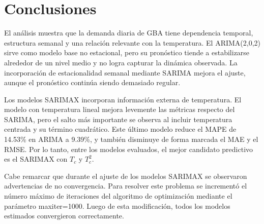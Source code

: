 \documentclass[11pt,a4paper]{article}
\begin{document}
\section{Conclusiones}

El análisis muestra que la demanda diaria de GBA tiene dependencia temporal, estructura semanal y una relación relevante con la temperatura. El ARIMA(2,0,2) sirve como modelo base no estacional, pero su pronóstico tiende a estabilizarse alrededor de un nivel medio y no logra capturar la dinámica observada. La incorporación de estacionalidad semanal mediante SARIMA mejora el ajuste, aunque el pronóstico continúa siendo demasiado regular.

Los modelos SARIMAX incorporan información externa de temperatura. El modelo con temperatura lineal mejora levemente las métricas respecto del SARIMA, pero el salto más importante se observa al incluir temperatura centrada y su término cuadrático. Este último modelo reduce el MAPE de 14.53\% en ARIMA a 9.39\%, y también disminuye de forma marcada el MAE y el RMSE. Por lo tanto, entre los modelos evaluados, el mejor candidato predictivo es el SARIMAX con \(T_c\) y \(T_c^2\).

Cabe remarcar que durante el ajuste de los modelos SARIMAX se observaron advertencias de no convergencia. Para resolver este problema se incrementó el número máximo de iteraciones del algoritmo de optimización mediante el parámetro maxiter=1000. Luego de esta modificación, todos los modelos estimados convergieron correctamente.
\end{document}
